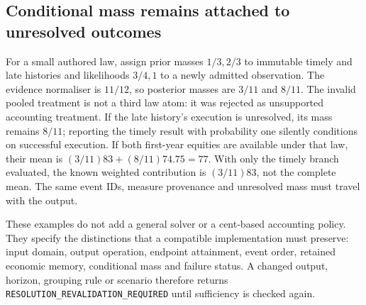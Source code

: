 \subsection*{Conditional mass remains attached to unresolved outcomes}

For a small authored law, assign prior masses \(1/3,2/3\) to immutable timely
and late histories and likelihoods \(3/4,1\) to a newly admitted observation.
The evidence normaliser is \(11/12\), so posterior masses are \(3/11\) and
\(8/11\). The invalid pooled treatment is not a third law atom: it was rejected
as unsupported accounting treatment. If the late history's execution is
unresolved, its mass remains \(8/11\); reporting the timely result with
probability one silently conditions on successful execution. If both
first-year equities are available under that law, their mean is
\((3/11)83+(8/11)74.75=77\). With only the timely branch evaluated, the
known weighted contribution is \((3/11)83\), not the complete mean.
The same event IDs, measure provenance and unresolved mass must travel with
the output.

These examples do not add a general solver or a cent-based accounting policy.
They specify the distinctions that a compatible implementation must preserve:
input domain, output operation, endpoint attainment, event order, retained
economic memory, conditional mass and failure status. A changed output,
horizon, grouping rule or scenario therefore returns
\texttt{RESOLUTION\_REVALIDATION\_REQUIRED} until sufficiency is checked again.
